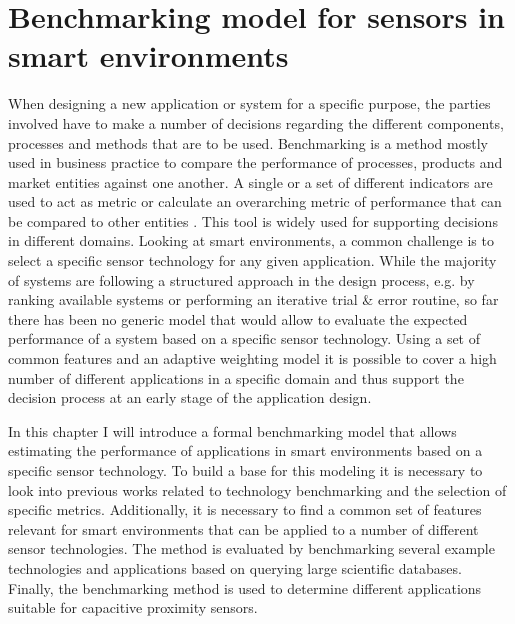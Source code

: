 \chapter{Benchmarking model for sensors in smart environments} \label{ch:benchmark}
When designing a new application or system for a specific purpose, the parties involved have to make a number of decisions regarding the different components, processes and methods that are to be used. Benchmarking is a method mostly used in business practice to compare the performance of processes, products and market entities against one another. A single or a set of different indicators are used to act as metric or calculate an overarching metric of performance that can be compared to other entities \cite{camp1989benchmarking}. This tool is widely used for supporting decisions in different domains. Looking at smart environments, a common challenge is to select a specific sensor technology for any given application. While the majority of systems are following a structured approach in the design process, e.g. by ranking available systems or performing an iterative trial \& error routine, so far there has been no generic model that would allow to evaluate the expected performance of a system based on a specific sensor technology. Using a set of common features and an adaptive weighting model it is possible to cover a high number of different applications in a specific domain and thus support the decision process at an early stage of the application design. 

In this chapter I will introduce a formal benchmarking model that allows estimating the performance of applications in smart environments based on a specific sensor technology. To build a base for this modeling it is necessary to look into previous works related to technology benchmarking and the  selection of specific metrics. Additionally, it is necessary to find a common set of features relevant for smart environments that can be applied to a number of different sensor technologies. The method is evaluated by benchmarking several example technologies and applications based on querying large scientific databases. Finally, the benchmarking method is used to determine different applications suitable for capacitive proximity sensors.

